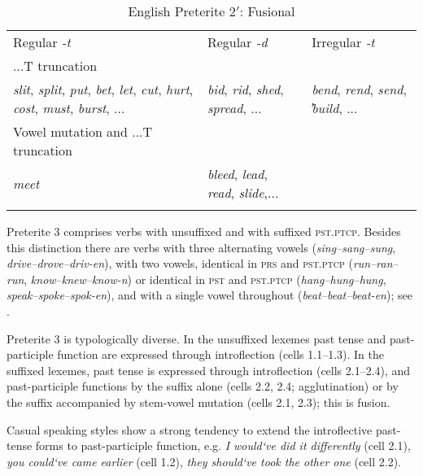 \documentclass[output=paper, colorlinks,citecolor=brown]{langsci/langscibook}
\begin{document}
\begin{table}
\caption{English Preterite 2$'$: Fusional\label{tab:andersen_10}}
\begin{tabularx}{\textwidth}{QQQ}
\lsptoprule
Regular \textit{-t} & Regular \textit{-d} & Irregular \textit{-t}\\
...T truncation &  & \\
\midrule
\textit{slit}, \textit{split}, \textit{put}, \textit{bet}, \textit{let}, \textit{cut}, \textit{hurt}, \textit{cost}, \textit{must}, \textit{burst}, ... & \textit{bid}, \textit{rid}, \textit{shed}, \textit{spread}, ... & \textit{bend}, \textit{rend}, \textit{send}, ̛\textit{build}, ...\\
Vowel mutation and ...T truncation &  & \\
\textit{meet} & \textit{bleed}, \textit{lead}, \textit{read}, \textit{slide},... & \\
\lspbottomrule
\end{tabularx}
\end{table}

\begin{sloppypar}
Preterite 3 comprises verbs with unsuffixed and with suffixed \textsc{pst.ptcp}. Besides this distinction there are verbs with three alternating vowels (\textit{sing–sang–sung}, \textit{drive–drove–driv-en}), with two vowels, identical in \textsc{prs} and \textsc{pst.ptcp} (\textit{run–ran–run}, \textit{know–knew–know-n}) or identical in \textsc{pst} and \textsc{pst.ptcp} (\textit{hang–hung–hung}, \textit{speak–spoke–spok-en}), and with a single vowel throughout (\textit{beat–beat–beat-en}); see .
\end{sloppypar}

Preterite 3 is typologically diverse. In the unsuffixed lexemes past tense and past-participle function are expressed through introflection (cells 1.1–1.3). In the suffixed lexemes, past tense is expressed through introflection (cells 2.1–2.4), and past-participle functions by the suffix alone (cells 2.2, 2.4; agglutination) or by the suffix accompanied by stem-vowel mutation (cells 2.1, 2.3); this is fusion. 

Casual speaking styles show a strong tendency to extend the introflective past-tense forms to past-participle function, e.g. \textit{I would`ve did it differently} (cell 2.1), \textit{you could`ve came earlier} (cell 1.2), \textit{they should`ve took the other one} (cell 2.2). 
\end{document}
